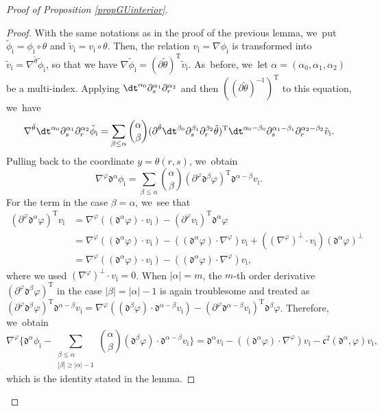 \begin{proof}[Proof of Proposition \ref{propGUinterior}]
\begin{proof}
With the same notations as in the proof of the previous lemma, we~put $\tilde{\phi}_\mathrm{i}=\phi_\mathrm{i}\circ\theta$ and $\tilde{v}_\mathrm{i}=v_\mathrm{i}\circ\theta$.
Then, the relation $v_\mathrm{i}=\nabla\phi_\mathrm{i}$ is transformed into $\tilde{v}_\mathrm{i}=\nabla^{\tilde{\theta}}\tilde{\phi}_\mathrm{i}$,
so that we have $\nabla\tilde{\phi}_\mathrm{i}=(\partial\tilde{\theta})^\mathrm{T}\tilde{v}_\mathrm{i}$. As~before, we~let $\alpha=(\alpha_0,\alpha_1,\alpha_2)$ be a multi-index.
Applying $\dt^{\alpha_0}\partial_s^{\alpha_1}\partial_r^{\alpha_2}$ and then $((\partial\tilde{\theta})^{-1})^\mathrm{T}$ to this equation, we~have
\[
\nabla^{\tilde{\theta}}\dt^{\alpha_0}\partial_s^{\alpha_1}\partial_r^{\alpha_2}\tilde{\phi}_\mathrm{i}
= \sum_{\beta\leq\alpha} \binom{\alpha}{\beta} (\partial^{\tilde{\theta}}\dt^{\beta_0}\partial_s^{\beta_1}\partial_r^{\beta_2}\tilde{\theta})^\mathrm{T}
\dt^{\alpha_0-\beta_0}\partial_s^{\alpha_1-\beta_1}\partial_r^{\alpha_2-\beta_2}\tilde{v}_\mathrm{i}.
\]
Pulling back to the coordinate $y=\theta(r,s)$, we~obtain
\[
\nabla^\varphi\mathfrak{d}^{\alpha}\phi_\mathrm{i}
= \sum_{\beta\leq\alpha} \binom{\alpha}{\beta} (\partial^\varphi\mathfrak{d}^{\beta}\varphi)^\mathrm{T}\mathfrak{d}^{\alpha-\beta}v_\mathrm{i}.
\]
For the term in the case $\beta=\alpha$, we~see that
\begin{align*}
(\partial^\varphi\mathfrak{d}^{\alpha}\varphi)^\mathrm{T}v_\mathrm{i}
&= \nabla^\varphi((\mathfrak{d}^{\alpha}\varphi)\cdot v_\mathrm{i}) - (\partial^\varphi v_\mathrm{i})^\mathrm{T}\mathfrak{d}^{\alpha}\varphi \\
&= \nabla^\varphi((\mathfrak{d}^{\alpha}\varphi)\cdot v_\mathrm{i}) - ((\mathfrak{d}^{\alpha}\varphi)\cdot\nabla^\varphi)v_\mathrm{i}
+ ((\nabla^\varphi)^\perp\cdot v_\mathrm{i})(\mathfrak{d}^{\alpha}\varphi)^\perp \\
&= \nabla^\varphi((\mathfrak{d}^{\alpha}\varphi)\cdot v_\mathrm{i}) - ((\mathfrak{d}^{\alpha}\varphi)\cdot\nabla^\varphi)v_\mathrm{i},
\end{align*}
where we used $(\nabla^\varphi)^\perp\cdot v_\mathrm{i}=0$.
When $|\alpha|=m$, the $m$-th order derivative $(\partial^\varphi\mathfrak{d}^{\beta}\varphi)^\mathrm{T}$ in the case $|\beta|=|\alpha|-1$
is again troublesome and treated as $(\partial^\varphi\mathfrak{d}^{\beta}\varphi)^\mathrm{T}\mathfrak{d}^{\alpha-\beta}v_\mathrm{i}
= \nabla^\varphi((\mathfrak{d}^{\beta}\varphi)\cdot\mathfrak{d}^{\alpha-\beta}v_\mathrm{i})
- (\partial^\varphi\mathfrak{d}^{\alpha-\beta}v_\mathrm{i})^\mathrm{T}\mathfrak{d}^{\beta}\varphi$.
Therefore, we~obtain
\[
\nabla^\varphi\biggl\{ \mathfrak{d}^{\alpha}\phi_\mathrm{i}
- \sum_{\substack{\beta\leq\alpha\\ |\beta|\geq|\alpha|-1}} \binom{\alpha}{\beta} (\mathfrak{d}^{\beta}\varphi)\cdot\mathfrak{d}^{\alpha-\beta}v_\mathrm{i} \biggr\}
= \mathfrak{d}^{\alpha}v_\mathrm{i} - ((\mathfrak{d}^{\alpha}\varphi)\cdot\nabla^\varphi)v_\mathrm{i} -\mathfrak{c}^2({\mathfrak d}^\alpha,\varphi)v_\mathrm{i},
\]
which is the identity stated in the lemma.
\end{proof}


\end{proof}
